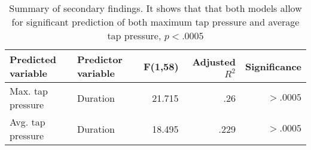 \begin{table*}[ht]
\centering
\begin{tabular}{@{}llrrr@{}}
\textbf{Predicted variable} & \textbf{Predictor variable} & \textbf{F(1,58)} & \textbf{Adjusted $R^2$} & \textbf{Significance} \\ \midrule
Max. tap pressure           & Duration                    & 21.715           & .26                     & $> .0005$             \\
Avg. tap pressure           & Duration                    & 18.495           & .229                    & $> .0005$            
\end{tabular}
\caption{Summary of secondary findings. It shows that that both models allow for significant prediction of both maximum tap pressure and average tap pressure, $p < .0005$}
\label{tab:secondary_findings}
\end{table*}